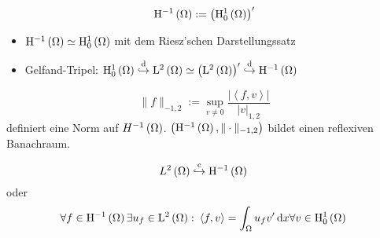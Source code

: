 \begin{definition}
	\begin{equation*}
		\mathrm{H}^{-1}\left(\Omega\right) := \left(\mathrm{H}^{1}_{0}\left(\Omega\right)\right)^{\prime}
	\end{equation*}
	\begin{itemize}
		\item $\mathrm{H}^{-1}\left(\Omega\right) \simeq \mathrm{H}^{1}_{0}\left(\Omega\right)$ mit dem Riesz'schen Darstellungssatz
		\item Gelfand-Tripel: $\H^{1}_{0}\left(\W\right)\dembed\L^{2}\left(\W\right)\simeq\left(\L^{2}\left(\W\right)\right)^{\prime}\dembed\H^{-1}\left(\W\right)$
	\end{itemize}
\end{definition}

\begin{lemma}[Satz]
	\begin{equation*}
		\|f\|_{-1,2} := \operatorname{sup}_{v\neq 0}\frac{|\left<f,v\right>|}{|v|_{1,2}}
	\end{equation*}
	definiert eine Norm auf $H^{-1}\left(\Omega\right)$. $\left(\mathrm{H}^{-1}\left(\Omega\right),\|\cdot\|_{-1,2}\right)$ bildet einen reflexiven Banachraum. 
	
	\begin{equation*}
		L^{2}\left(\W\right)\cembed\H^{-1}\left(\W\right){}
	\end{equation*}
	oder 
	\begin{equation*}
		\forall f\in\mathrm{H}^{-1}\left(\Omega\right)\exists u_{f}\in\mathrm{L}^{2}\left(\Omega\right)\colon\left<f,v\right>=\int_{\Omega}u_{f}v^{\prime}\,\mathrm{d} x \forall v\in\mathrm{H}^{1}_{0}\left(\Omega\right){}
	\end{equation*}
\end{lemma}
